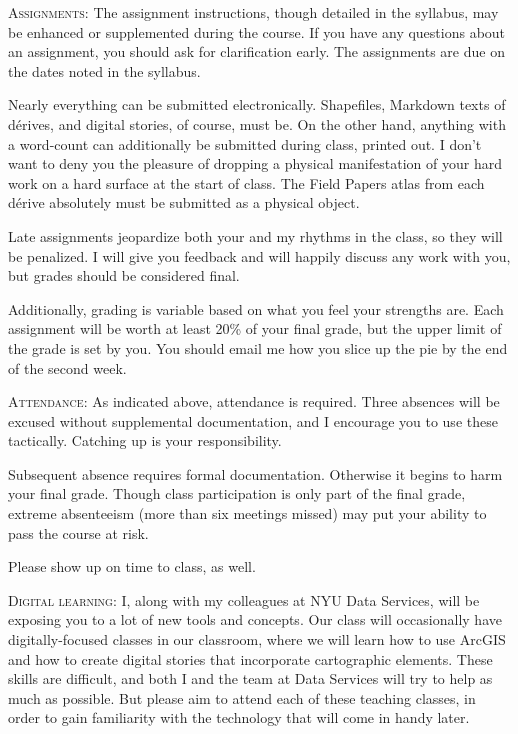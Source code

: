 \begin{description}

  \item \textsc{Assignments:} The assignment instructions, though detailed in
    the syllabus, may be enhanced or supplemented during the course. If you
    have any questions about an assignment, you should ask for clarification
    early. The assignments are due on the dates noted in the syllabus. 
    
    Nearly everything can be submitted electronically. Shapefiles, Markdown
    texts of dérives, and digital stories, of course, must be. On the other
    hand, anything with a word-count can additionally be submitted during
    class, printed out. I don’t want to deny you the pleasure of dropping a
    physical manifestation of your hard work on a hard surface at the start of
    class. The Field Papers atlas from each dérive absolutely must be submitted
    as a physical object. 
    
    Late assignments jeopardize both your and my rhythms in the class, so they
    will be penalized. I will give you feedback and will happily discuss any
    work with you, but grades should be considered final.

    Additionally, grading is variable based on what you feel your strengths are.
    Each assignment will be worth at least 20\% of your final grade, but the upper
    limit of the grade is set by you. You should email me how you slice up the
    pie by the end of the second week.

  \item \textsc{Attendance:} As indicated above, attendance is required. Three
    absences will be excused without supplemental documentation, and I
    encourage you to use these tactically. Catching up is your responsibility.

    Subsequent absence requires formal documentation. Otherwise it begins to
    harm your final grade. Though class participation is only part of the final
    grade, extreme absenteeism (more than six meetings missed) may put your
    ability to pass the course at risk.

    Please show up on time to class, as well.

  \item \textsc{Digital learning:} I, along with my colleagues at NYU Data
    Services, will be exposing you to a lot of new tools and concepts. Our
    class will occasionally have digitally-focused classes in our classroom,
    where we will learn how to use ArcGIS and how to create digital stories
    that incorporate cartographic elements. These skills are difficult, and
    both I and the team at Data Services will try to help as much as possible.
    But please aim to attend each of these teaching classes, in
    order to gain familiarity with the technology that will come in handy
    later.


\end{description}

